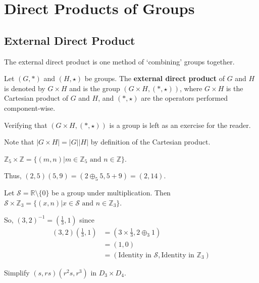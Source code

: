 \chapter{Direct Products of Groups}
\section{External Direct Product}
The external direct product is one method of `combining' groups together.
\begin{definition}
    Let $(G, \ast)$ and $(H, \star)$ be groups. The \textbf{external direct product} of $G$ and $H$ is denoted by $G\times H$ and is the group $(G\times H, (\ast, \star))$, where $G\times H$ is the Cartesian product of $G$ and $H$, and $(\ast, \star)$ are the operators performed component-wise.
\end{definition}
Verifying that $(G\times H, (\ast, \star))$ is a group is left as an exercise for the reader.

Note that $|G \times H| = |G||H|$ by definition of the Cartesian product.

\begin{example}
    $\mathbb{Z}_5 \times \mathbb{Z} = \{(m,n) \vert m \in \mathbb{Z}_5 \text{ and } n \in \mathbb{Z}\}$.

    Thus, $(2, 5)(5, 9) = (2 \oplus_5 5, 5 + 9) = (2, 14)$.
\end{example}

\begin{example}
    Let $\mathcal{S} = \mathbb{R}\setminus\{0\}$ be a group under multiplication. Then $\mathcal{S} \times \mathbb{Z}_3 = \{ (x, n) \vert x \in \mathcal{S} \text{ and } n \in \mathbb{Z}_3\}$.

    So, $(3, 2)^{-1} = \left(\frac13, 1\right)$ since
    \begin{align*}
        (3, 2)\left(\frac13, 1\right) &= \left(3 \times \frac13, 2 \oplus_3 1\right)\\
        &= (1, 0)\\
        &= (\text{Identity in }\mathcal{S}, \text{Identity in }\mathbb{Z}_3)
    \end{align*}
\end{example}

\begin{exercise}
    Simplify $(s, rs)(r^2s, r^3)$ in $D_3 \times D_4$.
\end{exercise}

